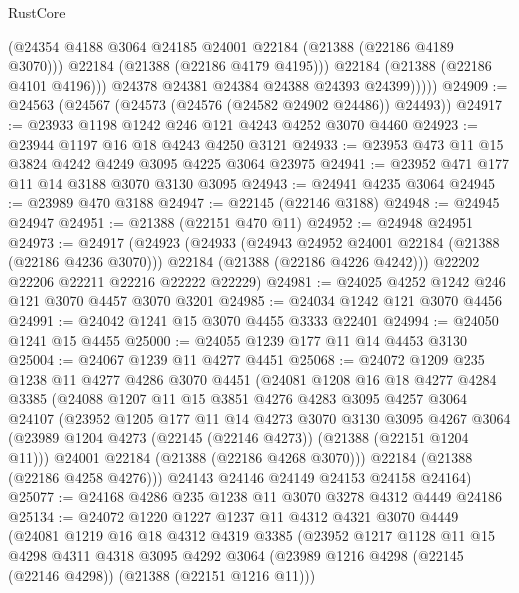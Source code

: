 \begin{lexlean}{RustCore}
\begin{coremodule}
                  (@24354 @4188 @3064 @24185 @24001 @22184 (@21388 (@22186 @4189 @3070)))
                  @22184
                  (@21388 (@22186 @4179 @4195)))
                @22184
                (@21388 (@22186 @4101 @4196)))
              @24378
              @24381
              @24384
              @24388
              @24393
              @24399)))))
@24909 := @24563 (@24567 (@24573 (@24576 (@24582 @24902 @24486)) @24493))
@24917 := @23933 @1198 @1242 @246 @121 @4243 @4252 @3070 @4460
@24923 := @23944 @1197 @16 @18 @4243 @4250 @3121
@24933 := @23953 @473 @11 @15 @3824 @4242 @4249 @3095 @4225 @3064 @23975
@24941 := @23952 @471 @177 @11 @14 @3188 @3070 @3130 @3095
@24943 := @24941 @4235 @3064
@24945 := @23989 @470 @3188
@24947 := @22145 (@22146 @3188)
@24948 := @24945 @24947
@24951 := @21388 (@22151 @470 @11)
@24952 := @24948 @24951
@24973 := @24917
    (@24923
      (@24933
        (@24943 @24952 @24001 @22184 (@21388 (@22186 @4236 @3070)))
        @22184
        (@21388 (@22186 @4226 @4242)))
      @22202
      @22206
      @22211
      @22216
      @22222
      @22229)
@24981 := @24025 @4252 @1242 @246 @121 @3070 @4457 @3070 @3201
@24985 := @24034 @1242 @121 @3070 @4456
@24991 := @24042 @1241 @15 @3070 @4455 @3333 @22401
@24994 := @24050 @1241 @15 @4455
@25000 := @24055 @1239 @177 @11 @14 @4453 @3130
@25004 := @24067 @1239 @11 @4277 @4451
@25068 := @24072
    @1209
    @235
    @1238
    @11
    @4277
    @4286
    @3070
    @4451
    (@24081
      @1208
      @16
      @18
      @4277
      @4284
      @3385
      (@24088
        @1207
        @11
        @15
        @3851
        @4276
        @4283
        @3095
        @4257
        @3064
        @24107
        (@23952
          @1205
          @177
          @11
          @14
          @4273
          @3070
          @3130
          @3095
          @4267
          @3064
          (@23989 @1204 @4273 (@22145 (@22146 @4273)) (@21388 (@22151 @1204 @11)))
          @24001
          @22184
          (@21388 (@22186 @4268 @3070)))
        @22184
        (@21388 (@22186 @4258 @4276)))
      @24143
      @24146
      @24149
      @24153
      @24158
      @24164)
@25077 := @24168 @4286 @235 @1238 @11 @3070 @3278 @4312 @4449 @24186
@25134 := @24072
    @1220
    @1227
    @1237
    @11
    @4312
    @4321
    @3070
    @4449
    (@24081
      @1219
      @16
      @18
      @4312
      @4319
      @3385
      (@23952
        @1217
        @1128
        @11
        @15
        @4298
        @4311
        @4318
        @3095
        @4292
        @3064
        (@23989 @1216 @4298 (@22145 (@22146 @4298)) (@21388 (@22151 @1216 @11)))

\end{coremodule}
\end{lexlean}
